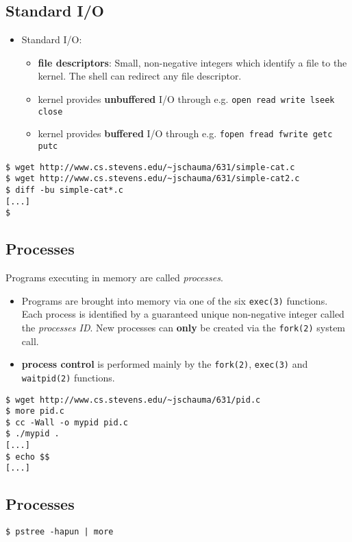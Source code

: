 \documentclass[xga]{xdvislides}
\begin{document}
\subsection{Standard I/O}
\begin{itemize}
	\item	Standard I/O:
		\begin{itemize}
			\item {\bf file descriptors}: Small, non-negative
				integers which identify a file to the kernel.
				The shell can redirect any file descriptor.
			\item kernel provides {\bf unbuffered} I/O through e.g.
				{\tt open read write lseek close}
			\item kernel provides {\bf buffered} I/O through e.g.
				{\tt fopen fread fwrite getc putc}
		\end{itemize}
\end{itemize}
\vspace*{\fill}
\begin{verbatim}
$ wget http://www.cs.stevens.edu/~jschauma/631/simple-cat.c
$ wget http://www.cs.stevens.edu/~jschauma/631/simple-cat2.c
$ diff -bu simple-cat*.c
[...]
$
\end{verbatim}
\vspace*{\fill}


\subsection{Processes}
Programs executing in memory are called {\em processes}.
\begin{itemize}
	\item Programs are brought into memory via one of the
		six {\tt exec(3)} functions.  Each process is identified
		by a guaranteed unique non-negative integer called the
		{\em processes ID}. New processes can {\bf only} be
		created via the {\tt fork(2)} system call.
	\item {\bf process control} is performed mainly by the
		{\tt fork(2)}, {\tt exec(3)} and {\tt waitpid(2)} functions.
\end{itemize}
\vspace*{\fill}
\begin{verbatim}
$ wget http://www.cs.stevens.edu/~jschauma/631/pid.c
$ more pid.c
$ cc -Wall -o mypid pid.c
$ ./mypid .
[...]
$ echo $$
[...]
\end{verbatim}
\vspace*{\fill}

\subsection{Processes}
\vspace*{\fill}
\Huge
\begin{center}
	{\tt \$ pstree -hapun | more}
\end{center}
\Normalsize
\vspace*{\fill}
\end{document}
